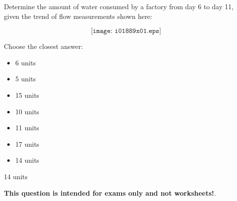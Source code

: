 

Determine the amount of water consumed by a factory from day 6 to day 11, given the trend of flow measurements shown here:

$$\texttt{[image: i01889x01.eps]}$$

Choose the closest answer:

\begin{itemize}
\item{} 6 units
\vskip 10pt 
\item{} 5 units
\vskip 10pt 
\item{} 15 units
\vskip 10pt 
\item{} 10 units
\vskip 10pt 
\item{} 11 units
\vskip 10pt 
\item{} 17 units
\vskip 10pt 
\item{} 14 units
\end{itemize}







14 units






{\bf This question is intended for exams only and not worksheets!}.



